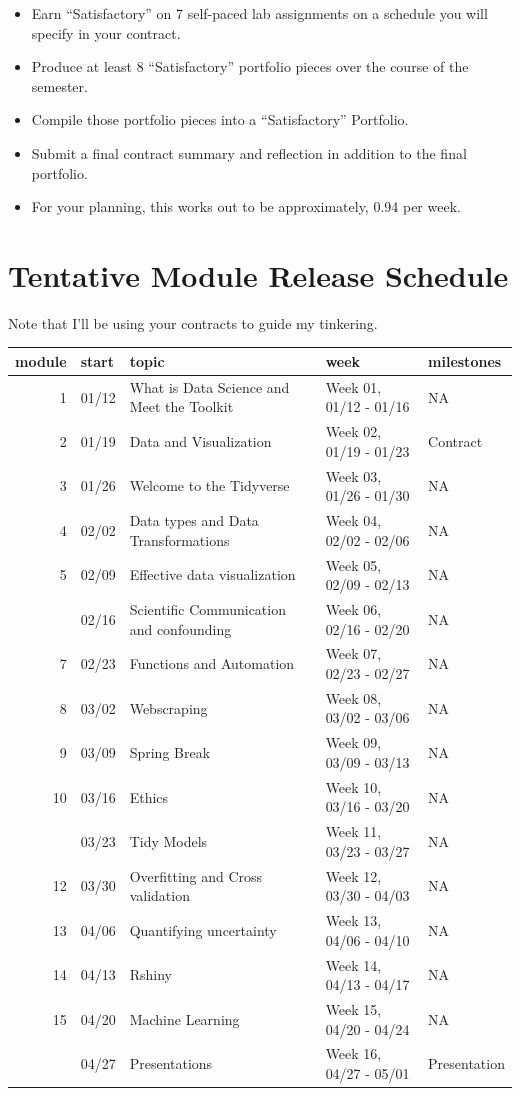 \documentclass[
]{book}
\begin{document}
\begin{itemize}
\item
  Earn ``Satisfactory'' on 7 self-paced lab assignments on a schedule you will specify in your contract.
\item
  Produce at least 8 ``Satisfactory'' portfolio pieces over the course of the semester.
\item
  Compile those portfolio pieces into a ``Satisfactory'' Portfolio.
\item
  Submit a final contract summary and reflection in addition to the final portfolio.
\item
  For your planning, this works out to be approximately, 0.94 per week.
\end{itemize}

\section*{Tentative Module Release Schedule}\label{tentative-module-release-schedule-1}


Note that I'll be using your contracts to guide my tinkering.

\begin{tabular}{rllll}
\toprule
module & start & topic & week & milestones\\
\midrule
1 & 01/12 & What is Data Science and Meet the Toolkit & Week 01, 01/12 - 01/16 & NA\\
2 & 01/19 & Data and Visualization & Week 02, 01/19 - 01/23 & Contract\\
3 & 01/26 & Welcome to the Tidyverse & Week 03, 01/26 - 01/30 & NA\\
4 & 02/02 & Data types and Data Transformations & Week 04, 02/02 - 02/06 & NA\\
5 & 02/09 & Effective data visualization & Week 05, 02/09 - 02/13 & NA\\
\addlinespace
6 & 02/16 & Scientific Communication and confounding & Week 06, 02/16 - 02/20 & NA\\
7 & 02/23 & Functions and Automation & Week 07, 02/23 - 02/27 & NA\\
8 & 03/02 & Webscraping & Week 08, 03/02 - 03/06 & NA\\
9 & 03/09 & Spring Break & Week 09, 03/09 - 03/13 & NA\\
10 & 03/16 & Ethics & Week 10, 03/16 - 03/20 & NA\\
\addlinespace
11 & 03/23 & Tidy Models & Week 11, 03/23 - 03/27 & NA\\
12 & 03/30 & Overfitting and Cross validation & Week 12, 03/30 - 04/03 & NA\\
13 & 04/06 & Quantifying uncertainty & Week 13, 04/06 - 04/10 & NA\\
14 & 04/13 & Rshiny & Week 14, 04/13 - 04/17 & NA\\
15 & 04/20 & Machine Learning & Week 15, 04/20 - 04/24 & NA\\
\addlinespace
16 & 04/27 & Presentations & Week 16, 04/27 - 05/01 & Presentation\\
\bottomrule
\end{tabular}
\end{document}
